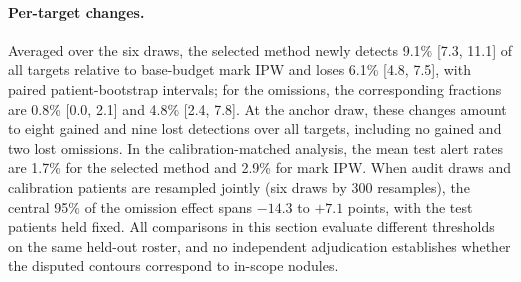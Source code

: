 \paragraph{Per-target changes.}
Averaged over the six draws, the selected method newly detects 9.1\% [7.3, 11.1] of all targets relative to base-budget mark IPW and loses 6.1\% [4.8, 7.5], with paired patient-bootstrap intervals; for the omissions, the corresponding fractions are 0.8\% [0.0, 2.1] and 4.8\% [2.4, 7.8]. At the anchor draw, these changes amount to eight gained and nine lost detections over all targets, including no gained and two lost omissions. In the calibration-matched analysis, the mean test alert rates are 1.7\% for the selected method and 2.9\% for mark IPW. When audit draws and calibration patients are resampled jointly (six draws by 300 resamples), the central 95\% of the omission effect spans $-14.3$ to $+7.1$ points, with the test patients held fixed. All comparisons in this section evaluate different thresholds on the same held-out roster, and no independent adjudication establishes whether the disputed contours correspond to in-scope nodules.
